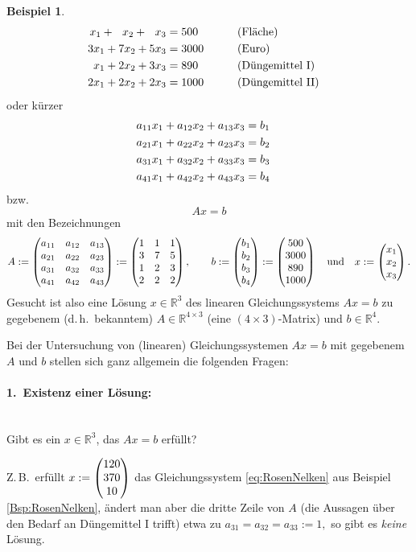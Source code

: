 \documentclass[a4paper,11pt,oneside]{article}
\theoremstyle{definition}
\newtheorem{example}{Beispiel}
\begin{document}
\begin{example}
\begin{alignat}{2}\label{eq:RosenNelken}
x_1+\ \ x_2+\ \ x_3&=500&&(\text{Fläche}) \cr
3x_1+7x_2+5x_3&=3000&&(\text{Euro})\cr
x_1+2x_2+3x_3&=890&\qquad&(\text{Düngemittel I})\cr
2x_1+2x_2+2x_3&=1000&&(\text{Düngemittel II})
\end{alignat}
oder kürzer
\begin{eqnarray*}
a_{11}x_1+a_{12}x_2+a_{13}x_3&=b_1\cr a_{21}x_1+a_{22}x_2+a_{23}x_3&=b_2\cr a_{31}x_1+a_{32}x_2+a_{33}x_3&=b_3\cr
a_{41}x_1+a_{42}x_2+a_{43}x_3&=b_4\cr
\end{eqnarray*}
bzw.
$$
Ax=b
$$
mit den Bezeichnungen
$$
A:=
\begin{pmatrix}
a_{11}&a_{12}&a_{13}\cr
a_{21}&a_{22}&a_{23}\cr
a_{31}&a_{32}&a_{33}\cr
a_{41}&a_{42}&a_{43}\cr
\end{pmatrix}
:=
\begin{pmatrix}
1&1&1\cr
3&7&5\cr
1&2&3\cr
2&2&2\cr
\end{pmatrix}
,\qquad
b:=
\begin{pmatrix}
b_1\cr
b_2\cr
b_3\cr
b_4\cr
\end{pmatrix}
:=
\begin{pmatrix}
500\cr
3000\cr
890\cr
1000
\end{pmatrix}
\quad \text{und} \quad
x:=\begin{pmatrix}
x_1\cr
x_2\cr
x_3\cr
\end{pmatrix}
.
$$
Gesucht ist also eine Lösung $x\in\mathbb R^3$ des linearen Gleichungssystems $Ax=b$ zu gegebenem (d.\,h.\ bekanntem) $A\in\mathbb R^{4\times 3}$ (eine $ (4\times 3)$-Matrix) und $b\in\mathbb R^4$.
\end{example}

Bei der Untersuchung von (linearen) Gleichungssystemen $ Ax=b$ mit gegebenem $A$ und $b$ stellen sich ganz allgemein die folgenden Fragen:

\paragraph{1.\ Existenz einer Lösung:}~\\
Gibt es ein $x\in\mathbb R^3$, das $Ax=b$ erfüllt?

Z.\,B.\ erfüllt $x:=\begin{pmatrix}120\cr 370\cr 10\end{pmatrix}$ das Gleichungssystem \eqref{eq:RosenNelken} aus Beispiel \ref{Bsp:RosenNelken}, ändert man aber die dritte Zeile von $A$ (die Aussagen über den Bedarf an Düngemittel I trifft) etwa zu $a_{31}=a_{32}=a_{33}:=1,$ so gibt es \emph{keine} Lösung.
\end{document}
